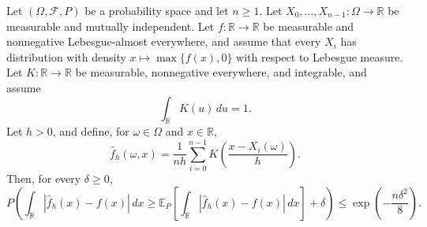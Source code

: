 \begin{theorem}
Let $(\Omega,\mathcal F,P)$ be a probability space and let $n\geq1$. Let
$X_0,\ldots,X_{n-1}:\Omega\to\mathbb R$ be measurable and mutually
independent. Let $f:\mathbb R\to\mathbb R$ be measurable and nonnegative
Lebesgue-almost everywhere, and assume that every $X_i$ has distribution
with density $x\mapsto\max\{f(x),0\}$ with respect to Lebesgue measure.
Let $K:\mathbb R\to\mathbb R$ be measurable, nonnegative everywhere, and
integrable, and assume
\[
 \int_{\mathbb R}K(u)\,du=1.
\]
Let $h>0$, and define, for $\omega\in\Omega$ and $x\in\mathbb R$,
\[
 \widehat f_h(\omega,x)=\frac1{nh}
 \sum_{i=0}^{n-1}K\!\left(\frac{x-X_i(\omega)}h\right).
\]
Then, for every $\delta\geq0$,
\[
 P\!\left(
 \int_{\mathbb R}|\widehat f_h(x)-f(x)|\,dx
 \geq
 \mathbb E_P\!\left[
 \int_{\mathbb R}|\widehat f_h(x)-f(x)|\,dx
 \right]+\delta
 \right)
 \leq \exp\!\left(-\frac{n\delta^2}{8}\right).
\]
\end{theorem}
